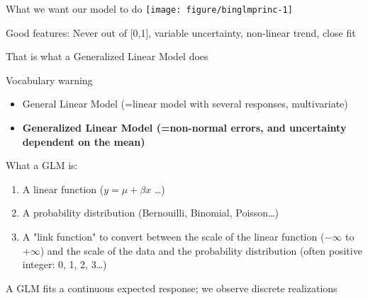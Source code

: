 \documentclass[10pt]{beamer}\usepackage[]{graphicx}\usepackage[]{color}
\newenvironment{knitrout}{}{} %
\begin{document}
\begin{frame}[fragile]{What we want our model to do}
\begin{knitrout}\small
{}\color{fgcolor}
\texttt{[image: figure/binglmprinc-1]} 

\end{knitrout}
    \begin{alertblock}{Good features:}
    Never out of [0,1], variable uncertainty, non-linear trend, close fit
  \end{alertblock}
\end{frame}

\begin{frame}{That is what a Generalized Linear Model does}

\begin{block}{Vocabulary warning}
  \begin{itemize}
    \item General Linear Model (=linear model with several responses, multivariate)
    \item \textbf{Generalized Linear Model (=non-normal errors, and uncertainty dependent on the mean)} 
  \end{itemize}
\end{block}

\pause

\begin{block}{What a GLM is:}
  \begin{enumerate}
    \item A linear function ($y = \mu + \beta x$ \dots)
    \item A probability distribution (Bernouilli, Binomial, Poisson\dots)
    \item A "link function" to convert between the scale of the linear function ($-\infty$ to $+\infty$) and the scale of the data and the probability distribution (often positive integer: 0, 1, 2, 3\dots)
  \end{enumerate}
  A GLM fits a continuous expected response; we observe discrete realizations
\end{block}

\end{frame}
\end{document}
